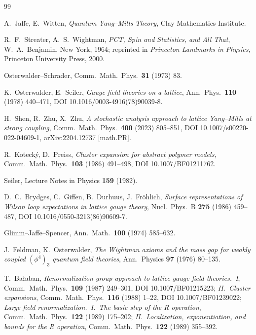{\small
\setlength{\itemsep}{1.2pt}
\begin{thebibliography}{99}

 A.~Jaffe, E.~Witten, \emph{Quantum Yang--Mills Theory}, Clay Mathematics
  Institute.

 R.~F.~Streater, A.~S.~Wightman, \emph{PCT, Spin and Statistics, and All That},
  W.~A.~Benjamin, New York, 1964; reprinted in \emph{Princeton Landmarks in Physics},
  Princeton University Press, 2000.

 Osterwalder--Schrader, Comm.\ Math.\ Phys.\ \textbf{31} (1973) 83.

 K.~Osterwalder, E.~Seiler, \emph{Gauge field theories on a
  lattice}, Ann.\ Phys.\ \textbf{110} (1978) 440--471, DOI 10.1016/0003-4916(78)90039-8.

 H.~Shen, R.~Zhu, X.~Zhu, \emph{A stochastic analysis approach to lattice
  Yang--Mills at strong coupling}, Comm.\ Math.\ Phys.\ \textbf{400} (2023) 805--851,
  DOI 10.1007/s00220-022-04609-1, arXiv:2204.12737 [math.PR].

 R.~Koteck\'y, D.~Preiss, \emph{Cluster expansion for abstract polymer models},
  Comm.\ Math.\ Phys.\ \textbf{103} (1986) 491--498, DOI 10.1007/BF01211762.

 Seiler, Lecture Notes in Physics \textbf{159} (1982).

 D.~C.~Brydges, C.~Giffen, B.~Durhuus, J.~Fr\"ohlich, \emph{Surface
  representations of Wilson loop expectations in lattice gauge theory}, Nucl.\ Phys.\ B
  \textbf{275} (1986) 459--487, DOI 10.1016/0550-3213(86)90609-7.

 Glimm--Jaffe--Spencer, Ann.\ Math.\ \textbf{100} (1974) 585--632.

 J.~Feldman, K.~Osterwalder, \emph{The Wightman axioms and the mass gap for
  weakly coupled $(\phi^4)_3$ quantum field theories}, Ann.\ Physics \textbf{97} (1976)
  80--135.

 T.~Ba{\l}aban, \emph{Renormalization group approach to lattice gauge field
  theories.\ I}, Comm.\ Math.\ Phys.\ \textbf{109} (1987) 249--301, DOI 10.1007/BF01215223;
  \emph{II.\ Cluster expansions}, Comm.\ Math.\ Phys.\ \textbf{116} (1988) 1--22,
  DOI 10.1007/BF01239022; \emph{Large field renormalization.\ I.\ The basic step of the
  R operation}, Comm.\ Math.\ Phys.\ \textbf{122} (1989) 175--202; \emph{II.\ Localization,
  exponentiation, and bounds for the R operation}, Comm.\ Math.\ Phys.\ \textbf{122} (1989)
  355--392.


\end{thebibliography}}
